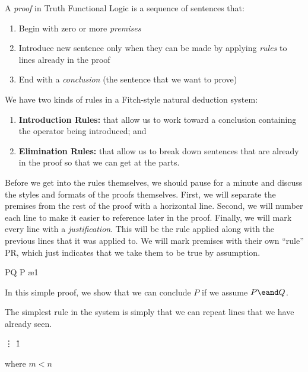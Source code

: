 \begin{definition}[Proof]
  \label{def:formal-proof}
  A \emph{proof} in Truth Functional Logic is a sequence of sentences that:
  \begin{enumerate}
  \item Begin with zero or more \emph{premises}
  \item Introduce new sentence only when they can be made by applying
    \emph{rules} to lines already in the proof
  \item End with a \emph{conclusion} (the sentence that we want to prove)
  \end{enumerate}  
\end{definition}

We have two kinds of rules in a Fitch-style natural deduction system:
\begin{enumerate}
\item \textbf{Introduction Rules:} that allow us to work toward a conclusion
  containing the operator being introduced; and
\item \textbf{Elimination Rules:} that allow us to break down sentences that
  are already in the proof so that we can get at the parts.
\end{enumerate}  

Before we get into the rules themselves, we should pause for a minute and
discuss the styles and formats of the proofs themselves. First, we will
separate the premises from the rest of the proof with a horizontal line. Second,
we will number each line to make it easier to reference later in the proof. 
Finally, we will mark every line with a \emph{justification}. This will be the
rule applied along with the previous lines that it was applied to. We will mark
premises with their own ``rule'' PR, which just indicates that we take them to
be true by assumption.

\vspace{-0.5\baselineskip}
\begin{fitchproof}
 {P\eand Q} 
 {P}        \ae{1}
\end{fitchproof}

In this simple proof, we show that we can conclude $P$ if we assume $P\eand Q$.

The simplest rule in the system is simply that we can repeat lines that we have
already seen.

\begin{fitchrule}[Repitition]
  \label{def:repitition-rule}
  \leavevmode
  \vspace{-0.9\baselineskip}
  \begin{fitchproof}
     \ephi
     {\vdots}    
     \ephi    \r{1}
  \end{fitchproof}
  \vspace{-0.9\baselineskip}
  where $m<n$
\end{fitchrule}

